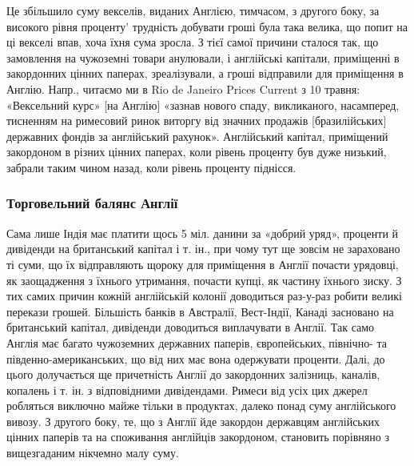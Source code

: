 \parcont{}  %
Це збільшило суму векселів, виданих Англією, тимчасом, з другого боку, за
високого рівня проценту' трудність добувати гроші була така велика, що попит
на ці векселі впав, хоча їхня сума зросла. З тієї самої причини сталося так,
що замовлення на чужоземні товари анулювали, і англійські капітали, приміщенні
в закордонних цінних паперах, зреалізували, а гроші відправили для
приміщення в Англію. Напр., читаємо ми в Rio de Janeiro Prices Current з 10
травня: «Вексельний курс» [на Англію] «зазнав нового спаду, викликаного,
насамперед, тисненням на римесовий ринок виторгу від значних продажів [бразилійських]
державних фондів за англійський рахунок». Англійський капітал, приміщений
закордоном в різних цінних паперах, коли рівень проценту був дуже
низький, забрали таким чином назад, коли рівень проценту піднісся.

\subsubsection{Торговельний балянс Англії}

Сама лише Індія має платити щось 5 міл. данини за «добрий уряд»,
проценти й дивіденди на британський капітал і т. ін., при чому тут ще зовсім
не зараховано ті суми, що їх відправляють щороку для приміщення в Англії
почасти урядовці, як заощадження з їхнього утримання, почасти купці, як частину
їхнього зиску. З тих самих причин кожній англійській колонії доводиться
раз-у-раз робити великі перекази грошей. Більшість банків в Австралії, Вест-Індії,
Канаді засновано на британський капітал, дивіденди доводиться виплачувати
в Англії. Так само Англія має багато чужоземних державних паперів, європейських,
північно- та південно-американських, що від них має вона одержувати
проценти. Далі, до цього долучається ще причетність Англії до закордонних
залізниць, каналів, копалень і т. ін. з відповідними дивідендами. Римеси від
усіх цих джерел робляться виключно майже тільки в продуктах, далеко понад
суму англійського вивозу. З другого боку, те, що з Англії йде закордон державцям
англійських цінних паперів та на споживання англійців закордоном, становить
порівняно з вищезгаданим нікчемно малу суму.

